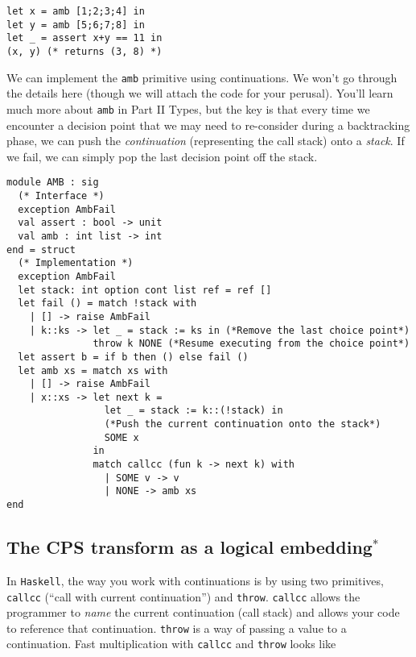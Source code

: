 \begin{code}
\label{code:amb-specification}
\begin{verbatim}
let x = amb [1;2;3;4] in
let y = amb [5;6;7;8] in
let _ = assert x+y == 11 in
(x, y) (* returns (3, 8) *)
\end{verbatim}
\end{code}

We can implement the \texttt{amb} primitive using continuations. We won't go through the details here (though we will attach the code for your perusal). You'll learn much more about \texttt{amb} in {\sffamily Part II Types}, but the key is that every time we encounter a decision point that we may need to re-consider during a backtracking phase, we can push the \emph{continuation} (representing the call stack) onto a \emph{stack}. If we fail, we can simply pop the last decision point off the stack. 

\begin{code}
\label{code:amb-specification}
\begin{verbatim}
module AMB : sig
  (* Interface *)
  exception AmbFail
  val assert : bool -> unit
  val amb : int list -> int
end = struct
  (* Implementation *)
  exception AmbFail
  let stack: int option cont list ref = ref []
  let fail () = match !stack with
    | [] -> raise AmbFail
    | k::ks -> let _ = stack := ks in (*Remove the last choice point*)
               throw k NONE (*Resume executing from the choice point*)
  let assert b = if b then () else fail ()
  let amb xs = match xs with
    | [] -> raise AmbFail
    | x::xs -> let next k = 
                 let _ = stack := k::(!stack) in 
                 (*Push the current continuation onto the stack*)
                 SOME x
               in
               match callcc (fun k -> next k) with
                 | SOME v -> v 
                 | NONE -> amb xs 
end
\end{verbatim}
\end{code}

\subsection{The CPS transform as a logical embedding$^{*}$}
In \texttt{Haskell}, the way you work with continuations is by using two primitives, \texttt{callcc} (``call with current continuation'') and \texttt{throw}. \texttt{callcc} allows the programmer to \emph{name} the current continuation (call stack) and allows your code to reference that continuation. \texttt{throw} is a way of passing a value to a continuation. Fast multiplication with \texttt{callcc} and \texttt{throw} looks like

